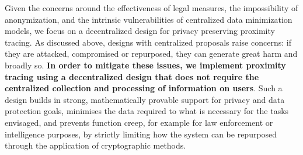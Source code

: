 \documentclass[12pt,a4paper]{article}
\begin{document}
Given the concerns around the effectiveness of legal measures, the impossibility of anonym\-ization, and the intrinsic vulnerabilities of centralized data minimization models, we focus on a decentralized design for privacy preserving proximity tracing. As discussed
above, designs with centralized proposals raise concerns: if they are attacked, compromised or repurposed, they can generate great harm and broadly so. \textbf{In order to mitigate these issues, we implement proximity tracing using a decentralized design that does not require the centralized collection and processing of information on users}. Such a design builds in strong, mathematically provable support for privacy and data protection
goals, minimises the data required to what is necessary for the tasks envisaged, and
prevents function creep, for example for law enforcement or intelligence purposes, by strictly limiting how the system can be repurposed through the application of cryptographic methods.
\end{document}
